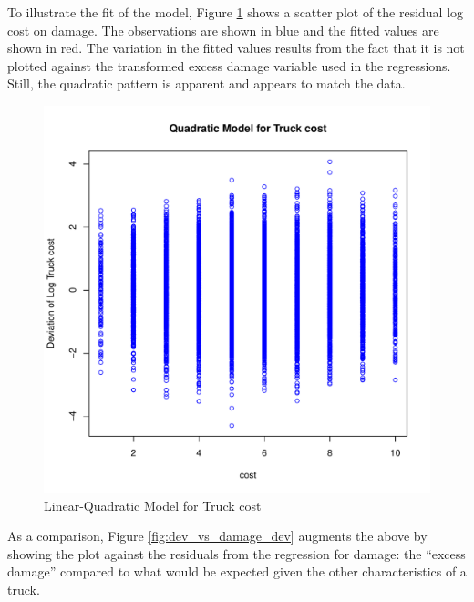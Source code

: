 \documentclass[11pt]{paper}
\begin{document}
\pagebreak 
To illustrate the fit of the model, 
Figure \ref{fig:dev_vs_cost} shows a scatter plot 
of the residual log cost on damage. 
The observations are shown in blue
and the fitted values are shown in red.
The variation in the fitted values results from the 
fact that it is not plotted against the transformed excess damage variable used in the regressions.
Still, the quadratic pattern is apparent
and appears to match the data. 

\begin{figure}[h!]
  \centering
  \includegraphics[scale = 0.5, keepaspectratio=true]{../Figures/dev_vs_cost}
  \caption{Linear-Quadratic Model for Truck cost} \label{fig:dev_vs_cost}
\end{figure}



\pagebreak
As a comparison, Figure \ref{fig:dev_vs_damage_dev} 
augments the above by showing the plot against the 
residuals from the regression for damage:
the ``excess damage'' compared to what would be 
expected given the other characteristics of a truck. 
\end{document}
